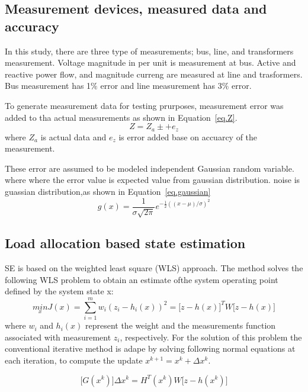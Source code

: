 \subsection{Measurement devices, measured data and accuracy}
In this study, there are three type of measurements; bus, line, and transformers measurement.
Voltage magnitude in per unit is measurement at bus. Active and reactive power flow, and magnitude curreng are measured at line and trasformers.
Bus measurement has 1$\%$ error and line measurement has 3$\%$ error.

To generate measurement data for testing prurposes, measurement error was added to tha actual measurements as shown in Equation~\ref{eq.Z}.
\begin{equation}
  Z=Z_{a} \pm +e_{z}
\label{eq.Z}
\end{equation}
where $Z_{a}$ is actual data and $e_{z}$ is error added base on accuarcy of the measurement.

These error are assumed to be modeled independent Gaussian random variable\cite{b2}.
where where the error value is expected value from gaussian distribution.
noise is guassian distribution,as shown in Equation~\ref{eq.gaussian}
\begin{equation}
  g(x)=\frac{1}{\sigma \sqrt{2\pi}}e^{-\frac{1}{2}((x-\mu)/\sigma)^2}
  \label{eq.gaussian}
\end{equation}

\subsection{Load allocation based state estimation}

SE is based on the weighted least square (WLS) approach\cite{b1}.
The method solves the following WLS problem to obtain an estimate ofthe system operating point defined by the system state x:
\begin{equation}
  \underset{x}{min} J(x)=\sum_{i=1}^{m}w_{i}(z_{i}-h_{i}(x))^{2}=\big[ z-h(x)\big]^{T}W\big[z-h(x)\big]
\label{eq.jacobian}
\end{equation}
where $w_{i}$ and $h_{i}(x)$ represent the weight and the measurements function associated with measurement $z_{i}$, respectively.
For the solution of this problem the conventional iterative method is adape by solving following normal equations at each iteration, to compute the update $x^{k+1}=x^{k}+\Delta x^{k}$.

\begin{equation}
  \big[ G(x^{k}) \big] \Delta x^{k} = H^{T}(x^{k})W \big[ z-h(x^{k}) \big]
\label{eq.delta_x}
\end{equation}

